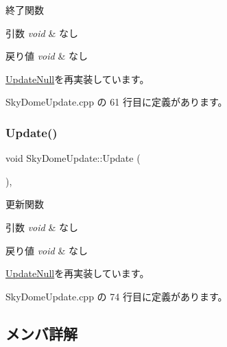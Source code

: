 終了関数 


\begin{DoxyParams}{引数}
{\em void} & なし \\
\hline
\end{DoxyParams}

\begin{DoxyRetVals}{戻り値}
{\em void} & なし \\
\hline
\end{DoxyRetVals}


\mbox{\hyperlink{class_update_null_a5bd107431c5039abe13c966edb047375}{Update\+Null}}を再実装しています。



 Sky\+Dome\+Update.\+cpp の 61 行目に定義があります。

\mbox{\label{class_sky_dome_update_ae163cb90e4de561fe1f7b2cb311be331}} 
\subsubsection{\texorpdfstring{Update()}{Update()}}
{\footnotesize\ttfamily void Sky\+Dome\+Update\+::\+Update (\begin{DoxyParamCaption}{ }\end{DoxyParamCaption})\hspace{0.3cm}{\ttfamily [override]}, {\ttfamily [virtual]}}



更新関数 


\begin{DoxyParams}{引数}
{\em void} & なし \\
\hline
\end{DoxyParams}

\begin{DoxyRetVals}{戻り値}
{\em void} & なし \\
\hline
\end{DoxyRetVals}


\mbox{\hyperlink{class_update_null_a692f4f34e4ef35ca286a1d3606fdf473}{Update\+Null}}を再実装しています。



 Sky\+Dome\+Update.\+cpp の 74 行目に定義があります。



\subsection{メンバ詳解}
\mbox{\label{class_sky_dome_update_a4c6750a54880db753cfe2a4ecfd24130}} 

